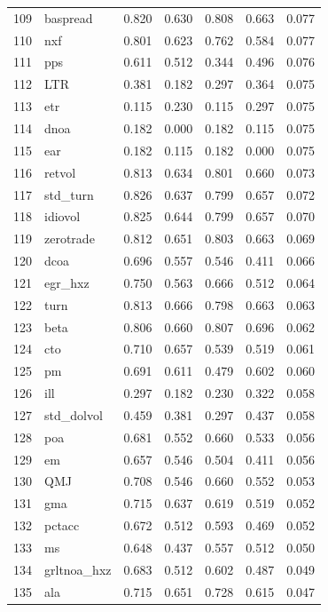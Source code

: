 \documentclass[12pt]{article}
\begin{document}
\begin{footnotesize}
\begin{longtable}{rl|c|c|c|c|c}
		109 & baspread & 0.820 & 0.630 & 0.808 & 0.663 & 0.077 \\ 
		110 & nxf & 0.801 & 0.623 & 0.762 & 0.584 & 0.077 \\ 
		111 & pps & 0.611 & 0.512 & 0.344 & 0.496 & 0.076 \\ 
		112 & LTR & 0.381 & 0.182 & 0.297 & 0.364 & 0.075 \\ 
		113 & etr & 0.115 & 0.230 & 0.115 & 0.297 & 0.075 \\ 
		114 & dnoa & 0.182 & 0.000 & 0.182 & 0.115 & 0.075 \\ 
		115 & ear & 0.182 & 0.115 & 0.182 & 0.000 & 0.075 \\ 
		116 & retvol & 0.813 & 0.634 & 0.801 & 0.660 & 0.073 \\ 
		117 & std\_turn & 0.826 & 0.637 & 0.799 & 0.657 & 0.072 \\ 
		118 & idiovol & 0.825 & 0.644 & 0.799 & 0.657 & 0.070 \\ 
		119 & zerotrade & 0.812 & 0.651 & 0.803 & 0.663 & 0.069 \\ 
		120 & dcoa & 0.696 & 0.557 & 0.546 & 0.411 & 0.066 \\ 
		121 & egr\_hxz & 0.750 & 0.563 & 0.666 & 0.512 & 0.064 \\ 
		122 & turn & 0.813 & 0.666 & 0.798 & 0.663 & 0.063 \\ 
		123 & beta & 0.806 & 0.660 & 0.807 & 0.696 & 0.062 \\ 
		124 & cto & 0.710 & 0.657 & 0.539 & 0.519 & 0.061 \\ 
		125 & pm & 0.691 & 0.611 & 0.479 & 0.602 & 0.060 \\ 
		126 & ill & 0.297 & 0.182 & 0.230 & 0.322 & 0.058 \\ 
		127 & std\_dolvol & 0.459 & 0.381 & 0.297 & 0.437 & 0.058 \\ 
		128 & poa & 0.681 & 0.552 & 0.660 & 0.533 & 0.056 \\ 
		129 & em & 0.657 & 0.546 & 0.504 & 0.411 & 0.056 \\ 
		130 & QMJ & 0.708 & 0.546 & 0.660 & 0.552 & 0.053 \\ 
		131 & gma & 0.715 & 0.637 & 0.619 & 0.519 & 0.052 \\ 
		132 & pctacc & 0.672 & 0.512 & 0.593 & 0.469 & 0.052 \\ 
		133 & ms & 0.648 & 0.437 & 0.557 & 0.512 & 0.050 \\ 
		134 & grltnoa\_hxz & 0.683 & 0.512 & 0.602 & 0.487 & 0.049 \\ 
		135 & ala & 0.715 & 0.651 & 0.728 & 0.615 & 0.047 \\ 

\end{longtable}
\end{footnotesize}
\end{document}
